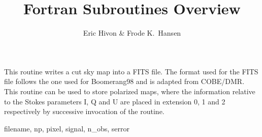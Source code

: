 
\sloppy


\title{\healpix Fortran Subroutines Overview}
 \section[write\_fits\_cut4]{ }
\label{sub:write_fits_cut4}
\author{Eric Hivon \& Frode K.~Hansen}

\begin{facility}
{This routine writes a cut sky \healpix map into a FITS file. The format used for the
FITS file follows the one used for Boomerang98 and is adapted from COBE/DMR. 
This routine can be used to store polarized maps, where the
information relative to the Stokes parameters I, Q and U are placed in extension
0, 1 and 2 respectively by successive invocation of the routine.}
{\modFitstools}
\end{facility}

\begin{f90format}
{filename, np, pixel, signal, n\_obs, serror }
\end{f90format}
\aboutoptional

